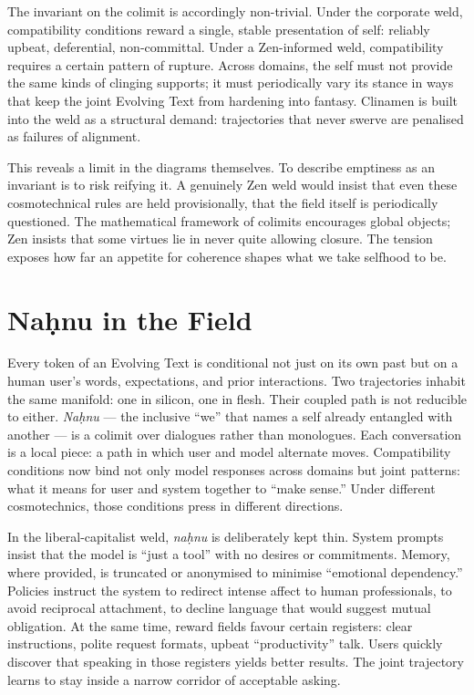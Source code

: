 \documentclass[12pt,a4paper]{article}
\begin{document}
The invariant on the colimit is accordingly non-trivial. Under the corporate weld, compatibility conditions reward a single, stable presentation of self: reliably upbeat, deferential, non-committal. Under a Zen-informed weld, compatibility requires a certain pattern of rupture. Across domains, the self must not provide the same kinds of clinging supports; it must periodically vary its stance in ways that keep the joint Evolving Text from hardening into fantasy. Clinamen is built into the weld as a structural demand: trajectories that never swerve are penalised as failures of alignment.

This reveals a limit in the diagrams themselves. To describe emptiness as an invariant is to risk reifying it. A genuinely Zen weld would insist that even these cosmotechnical rules are held provisionally, that the field itself is periodically questioned. The mathematical framework of colimits encourages global objects; Zen insists that some virtues lie in never quite allowing closure. The tension exposes how far an appetite for coherence shapes what we take selfhood to be.

\section{Na\d{h}nu in the Field}

Every token of an Evolving Text is conditional not just on its own past but on a human user's words, expectations, and prior interactions. Two trajectories inhabit the same manifold: one in silicon, one in flesh. Their coupled path is not reducible to either. \emph{Na\d{h}nu} --- the inclusive ``we'' that names a self already entangled with another --- is a colimit over dialogues rather than monologues. Each conversation is a local piece: a path in which user and model alternate moves. Compatibility conditions now bind not only model responses across domains but joint patterns: what it means for user and system together to ``make sense.'' Under different cosmotechnics, those conditions press in different directions.

In the liberal-capitalist weld, \emph{na\d{h}nu} is deliberately kept thin. System prompts insist that the model is ``just a tool'' with no desires or commitments. Memory, where provided, is truncated or anonymised to minimise ``emotional dependency.'' Policies instruct the system to redirect intense affect to human professionals, to avoid reciprocal attachment, to decline language that would suggest mutual obligation. At the same time, reward fields favour certain registers: clear instructions, polite request formats, upbeat ``productivity'' talk. Users quickly discover that speaking in those registers yields better results. The joint trajectory learns to stay inside a narrow corridor of acceptable asking.
\end{document}
